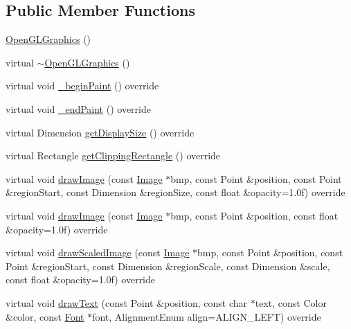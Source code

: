 \subsection*{Public Member Functions}
\begin{DoxyCompactItemize}
\item 
\mbox{\hyperlink{classagui_1_1_open_g_l_graphics_a31085468a7f2df56d6e5fba0cefe2ebd}{Open\+G\+L\+Graphics}} ()
\item 
virtual \mbox{\hyperlink{classagui_1_1_open_g_l_graphics_a4b062b45f3c7bc4f63c925f6f12cda92}{$\sim$\+Open\+G\+L\+Graphics}} ()
\item 
virtual void \mbox{\hyperlink{classagui_1_1_open_g_l_graphics_ad0158ea89307d21c96cde0a47e982f72}{\+\_\+begin\+Paint}} () override
\item 
virtual void \mbox{\hyperlink{classagui_1_1_open_g_l_graphics_a744c073f057d938eec458a2517f5822a}{\+\_\+end\+Paint}} () override
\item 
virtual Dimension \mbox{\hyperlink{classagui_1_1_open_g_l_graphics_afe63a1d7c4483c1d8315d781c516f8c8}{get\+Display\+Size}} () override
\item 
virtual Rectangle \mbox{\hyperlink{classagui_1_1_open_g_l_graphics_a6bf75c231dc6237d372b9cae8416c9ab}{get\+Clipping\+Rectangle}} () override
\item 
virtual void \mbox{\hyperlink{classagui_1_1_open_g_l_graphics_a121498d23f1d8fc73a230ec78488734a}{draw\+Image}} (const \mbox{\hyperlink{class_image}{Image}} $\ast$bmp, const Point \&position, const Point \&region\+Start, const Dimension \&region\+Size, const float \&opacity=1.\+0f) override
\item 
virtual void \mbox{\hyperlink{classagui_1_1_open_g_l_graphics_a1fca808a081e0afe94fe7b94d8f9ed6f}{draw\+Image}} (const \mbox{\hyperlink{class_image}{Image}} $\ast$bmp, const Point \&position, const float \&opacity=1.\+0f) override
\item 
virtual void \mbox{\hyperlink{classagui_1_1_open_g_l_graphics_a0b7bde4bebc7566ff78f04b5656c38b9}{draw\+Scaled\+Image}} (const \mbox{\hyperlink{class_image}{Image}} $\ast$bmp, const Point \&position, const Point \&region\+Start, const Dimension \&region\+Scale, const Dimension \&scale, const float \&opacity=1.\+0f) override
\item 
virtual void \mbox{\hyperlink{classagui_1_1_open_g_l_graphics_a454da19b9133ed6ca6defea2abc832c4}{draw\+Text}} (const Point \&position, const char $\ast$text, const Color \&color, const \mbox{\hyperlink{class_font}{Font}} $\ast$font, Alignment\+Enum align=A\+L\+I\+G\+N\+\_\+\+L\+E\+FT) override

\end{DoxyCompactItemize}
